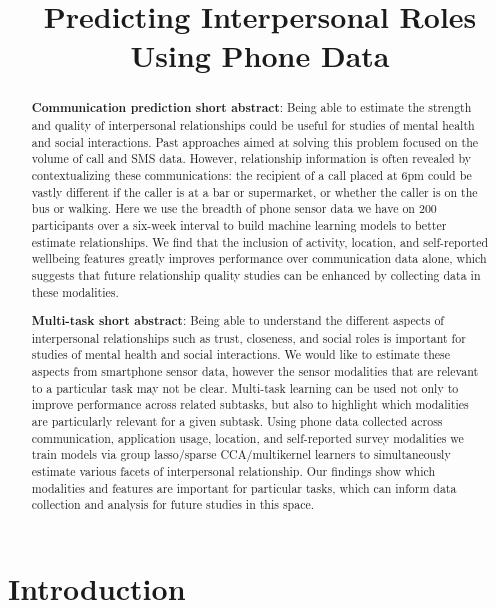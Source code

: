 \documentclass{article}
\title{Predicting Interpersonal Roles Using Phone Data}
\date{}
\author{}
\begin{document}
\maketitle

\begin{abstract}
    \textbf{Communication prediction short abstract}: Being able to estimate the strength and quality of interpersonal relationships could be useful for studies of mental health and social interactions. Past approaches aimed at solving this problem focused on the volume of call and SMS data. However, relationship information is often revealed by contextualizing these communications: the recipient of a call placed at 6pm could be vastly different if the caller is at a bar or supermarket, or whether the caller is on the bus or walking. Here we use the breadth of phone sensor data we have on 200 participants over a six-week interval to build machine learning models to better estimate relationships. We find that the inclusion of activity, location, and self-reported wellbeing features greatly improves performance over communication data alone, which suggests that future relationship quality studies can be enhanced by collecting data in these modalities.


    \textbf{Multi-task short abstract}: Being able to understand the different aspects of interpersonal relationships such as trust, closeness, and social roles is important for studies of mental health and social interactions. We would like to estimate these aspects from smartphone sensor data, however the sensor modalities that are relevant to a particular task may not be clear. Multi-task learning can be used not only to improve performance across related subtasks, but also to highlight which modalities are particularly relevant for a given subtask. Using phone data collected across communication, application usage, location, and self-reported survey modalities we train models via group lasso/sparse CCA/multikernel learners to simultaneously estimate various facets of interpersonal relationship. Our findings show which modalities and features are important for particular tasks, which can inform data collection and analysis for future studies in this space.

\end{abstract}

\section{Introduction}
\end{document}
